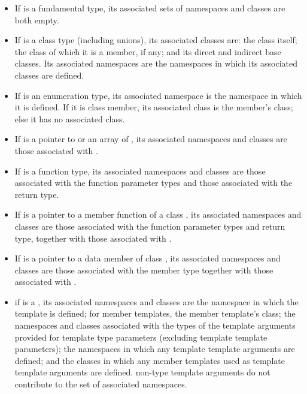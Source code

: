 \begin{itemize}
\item If  is a fundamental type, its associated sets of
namespaces and classes are both empty.

\item If  is a class type (including unions), its associated
classes are: the class itself; the class of which it is a member, if
any; and its direct and indirect base classes. Its associated namespaces
are the namespaces in which its associated classes are defined.

\item If  is an enumeration type, its associated namespace is
the namespace in which it is defined. If it is class member, its
associated class is the member's class; else it has no associated class.

\item If  is a pointer to  or an array of ,
its associated namespaces and classes are those associated with
.

\item If  is a function type, its associated namespaces and
classes are those associated with the function parameter types and those
associated with the return type.

\item If  is a pointer to a member function of a class
, its associated namespaces and classes are those associated
with the function parameter types and return type, together with those
associated with .

\item If  is a pointer to a data member of class , its
associated namespaces and classes are those associated with the member
type together with those associated with .

\item if  is a , its
associated namespaces and classes are the namespace in which the template is
defined; for member templates, the member template's class; the namespaces
and classes associated with the types of the template arguments provided for
template type parameters (excluding template template parameters); the
namespaces in which any template template arguments are defined; and the
classes in which any member templates used as template template
arguments are defined. \enternote non-type template arguments do not
contribute to the set of associated namespaces.\exitnote

\end{itemize}

